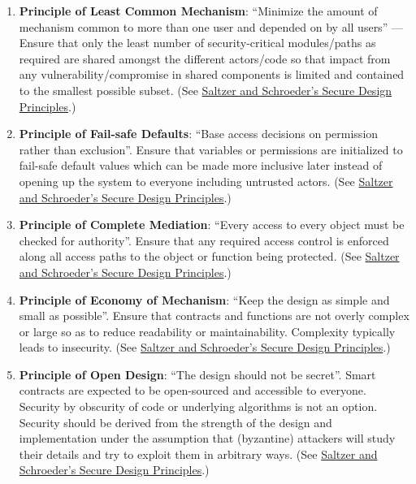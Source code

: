 \begin{enumerate}
\item\textbf{Principle of Least Common Mechanism}: “Minimize the amount of mechanism common to more than one user and depended on by all users” — Ensure that only the least number of security-critical modules/paths as required are shared amongst the different actors/code so that impact from any vulnerability/compromise in shared components is limited and contained to the smallest possible subset. (See \href{https://en.wikipedia.org/wiki/Saltzer\_and\_Schroeder's\_design\_principles}{Saltzer and Schroeder's Secure Design Principles}.)

\item\textbf{Principle of Fail-safe Defaults}: “Base access decisions on permission rather than exclusion”. Ensure that variables or permissions are initialized to fail-safe default values which can be made more inclusive later instead of opening up the system to everyone including untrusted actors. (See \href{https://en.wikipedia.org/wiki/Saltzer\_and\_Schroeder's\_design\_principles}{Saltzer and Schroeder's Secure Design Principles}.)

\item\textbf{Principle of Complete Mediation}: “Every access to every object must be checked for authority”. Ensure that any required access control is enforced along all access paths to the object or function being protected. (See \href{https://en.wikipedia.org/wiki/Saltzer\_and\_Schroeder's\_design\_principles}{Saltzer and Schroeder's Secure Design Principles}.)

\item\textbf{Principle of Economy of Mechanism}: “Keep the design as simple and small as possible”. Ensure that contracts and functions are not overly complex or large so as to reduce readability or maintainability. Complexity typically leads to insecurity. (See \href{https://en.wikipedia.org/wiki/Saltzer\_and\_Schroeder's\_design\_principles}{Saltzer and Schroeder's Secure Design Principles}.)

\item\textbf{Principle of Open Design}: “The design should not be secret”. Smart contracts are expected to be open-sourced and accessible to everyone. Security by obscurity of code or underlying algorithms is not an option. Security should be derived from the strength of the design and implementation under the assumption that (byzantine) attackers will study their details and try to exploit them in arbitrary ways. (See \href{https://en.wikipedia.org/wiki/Saltzer\_and\_Schroeder's\_design\_principles}{Saltzer and Schroeder's Secure Design Principles}.)


\end{enumerate}
